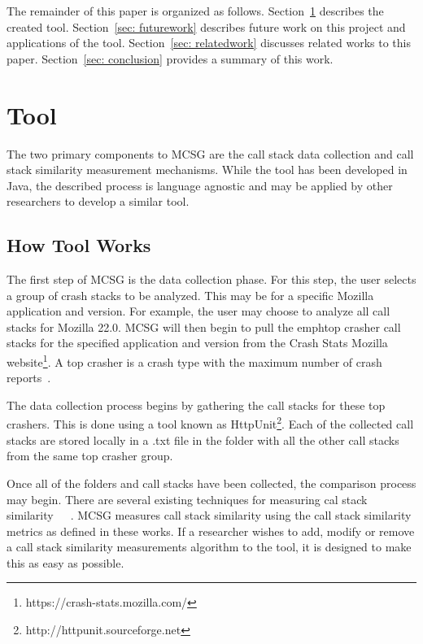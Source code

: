 \documentclass{sig-alternate}
\begin{document}
The remainder of this paper is organized as follows. Section~\ref{sec: tool} describes the created tool. Section~\ref{sec: futurework} describes future work on this project and applications of the tool. Section~\ref{sec: relatedwork} discusses related works to this paper. Section~\ref{sec: conclusion} provides a summary of this work.





\section{Tool}
\label{sec: tool}

The two primary components to MCSG are the call stack data collection and call stack similarity measurement mechanisms. While the tool has been developed in Java, the described process is language agnostic and may be applied by other researchers to develop a similar tool.


\subsection{How Tool Works}

The first step of MCSG is the data collection phase. For this step, the user selects a group of crash stacks to be analyzed. This may be for a specific Mozilla application and version. For example, the user may choose to analyze all call stacks for Mozilla  22.0. MCSG will then begin to pull the emph{top crasher} call stacks for the specified application and version from the Crash Stats Mozilla website\footnote{https://crash-stats.mozilla.com/}. A top crasher is a crash type with the maximum number of crash reports~\cite{Dhaliwal:2011:CFC:2117694.2119726}.

The data collection process begins by gathering the call stacks for these top crashers. This is done using a tool known as HttpUnit\footnote{http://httpunit.sourceforge.net}. Each of the collected call stacks are stored locally in a .txt file in the folder with all the other call stacks from the same top crasher group.

Once all of the folders and call stacks have been collected, the comparison process may begin. There are several existing techniques for measuring cal stack similarity~\cite{Brodie2}~\cite{Bartz:2008:FSF:1855895.1855896}~\cite{4401026}. MCSG measures call stack similarity using the call stack similarity metrics as defined in these works. If a researcher wishes to add, modify or remove a call stack similarity measurements algorithm to the tool, it is designed to make this as easy as possible.
\end{document}
